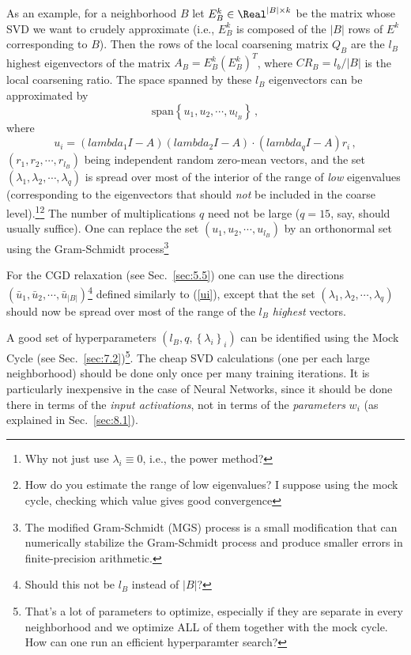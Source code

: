 \documentclass{article} %
\begin{document}
As an example, for a neighborhood $B$ let $E^k_B \in \Real^{|B| \times k}$ be the matrix whose SVD we want to crudely approximate (i.e., $E^k_B$ is composed of the $|B|$ rows of $E^k$ corresponding to $B$). Then the rows of the local coarsening matrix $Q_B$ are the $l_B$ highest eigenvectors of the matrix $A_B = E^k_B (E^k_B)^T$, where $CR_B = l_b/|B|$ is the local coarsening ratio. The space spanned by these $l_B$ eigenvectors can be approximated by
$$ \text{span}\left\{u_1, u_2, \cdots, u_{l_B} \right\}\,,$$
where
\begin{equation}
    u_i = \left(lambda_1 I - A\right) \left(lambda_2 I - A\right) \cdot \left(lambda_q I - A\right) r_i\,,
    \label{ui}
\end{equation}
$(r_1, r_2, \cdots, r_{l_B})$ being independent random zero-mean vectors, and the set $(\lambda_1, \lambda_2, \cdots, \lambda_q)$ is spread over most of the interior of the range of {\it low} eigenvalues (corresponding to the eigenvectors that should {\it not} be included in the coarse level).\footnote{Why not just use $\lambda_i \equiv 0$, i.e., the power method?}\footnote{How do you estimate the range of low eigenvalues? I suppose using the mock cycle, checking which value gives good convergence} The number of multiplications $q$ need not be large ($q = 15$, say, should usually suffice). One can replace the set $(u_1, u_2, \cdots, u_{l_B})$ by an orthonormal set using the Gram-Schmidt process\footnote{The modified Gram-Schmidt (MGS) process is a small modification that can numerically stabilize the Gram-Schmidt process and produce smaller errors in finite-precision arithmetic.}

For the CGD relaxation (see Sec.~\ref{sec:5.5}) one can use the directions $(\bar{u}_1, \bar{u}_2, \cdots, \bar{u}_{|B|})$\footnote{Should this not be $l_B$ instead of $|B|$?} defined similarly to (\ref{ui}), except that the set $(\lambda_1, \lambda_2, \cdots, \lambda_q)$ should now be spread over most of the range of the $l_B$ {\it highest} vectors.

A good set of hyperparameters $(l_B, q, \left\{\lambda_i\right\}_i)$ can be identified using the Mock Cycle (see Sec.~\ref{sec:7.2})\footnote{That's a lot of parameters to optimize, especially if they are separate in every neighborhood and we optimize ALL of them together with the mock cycle. How can one run an efficient hyperparamter search?}. The cheap SVD calculations (one per each large neighborhood) should be done only once per many training iterations. It is particularly inexpensive in the case of Neural Networks, since it should be done there in terms of the {\it input activations}, not in terms of the {\it parameters} $w_i$ (as explained in Sec.~\ref{sec:8.1}).
\end{document}

